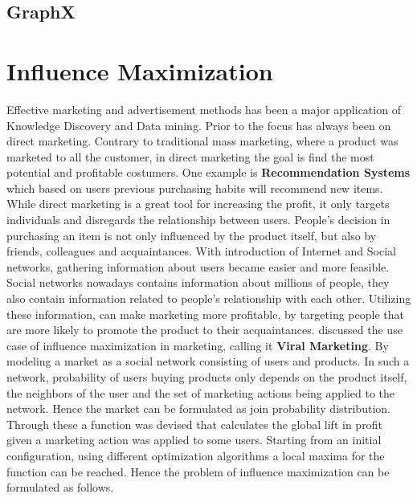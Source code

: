 \documentclass[english]{tktltiki}
\begin{document}
\subsection{GraphX}

\newpage

\section{Influence Maximization}
Effective marketing and advertisement methods has been a major application of Knowledge Discovery and Data mining. Prior to \cite{domingo01} the focus has always been on direct marketing. Contrary to traditional mass marketing, where a product was marketed to all the customer, in direct marketing the goal is find the most potential and profitable costumers.  One example is \textbf{Recommendation Systems} which based on users previous purchasing habits will recommend new items. While direct marketing is a great tool for increasing the profit, it only targets individuals and disregards the relationship between users. People's decision in purchasing an item is not only influenced by the product itself, but also by friends, colleagues and acquaintances. With introduction of Internet and Social networks, gathering information about users became easier and more feasible. Social networks nowadays contains information about millions of people, they also contain information related to people's relationship with each other. Utilizing these information, can make marketing more profitable, by targeting people that are more likely to promote the product to their acquaintances. 
\cite{domingo01} discussed the use case of influence maximization in marketing, calling it \textbf{Viral Marketing}. By modeling a market as a social network consisting of users and products. In such a network, probability of users buying products only depends on the product itself, the neighbors of the user and the set of marketing actions being applied to the network. Hence the market can be formulated as join probability distribution. 
Through these a function was devised that calculates the global lift in profit given a marketing action was applied to some users. Starting from an initial configuration, using different optimization algorithms a local maxima for the function can be reached. Hence the problem of influence maximization can be formulated as follows. \\ \\
\end{document}
